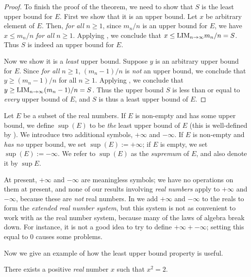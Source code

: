 \begin{proof}
To finish the proof of the theorem, we need to show that \(S\) is the least upper bound for \(E\).
First we show that it is an upper bound.
Let \(x\) be arbitrary element of \(E\).
Then, \emph{for all} \(n \ge 1\), since \(m_n/n\) is an upper bound for \(E\), we have \(x \le m_n/n\) \emph{for all} \(n \ge 1\).
Applying , we conclude that \(x \le \text{LIM}_{n \to \infty} m_n/n = S\).
Thus \(S\) is indeed an upper bound for \(E\).

Now we show it is a \emph{least} upper bound.
Suppose \(y\) is an arbitrary upper bound for \(E\).
Since \emph{for all} \(n \ge 1\), \((m_n - 1)/n\) is \emph{not} an upper bound, we conclude that \(y \ge (m_n - 1)/n\) for all \(n \ge 1\).
Applying , we conclude that \(y \ge \text{LIM}_{n \to \infty}(m_n - 1)/n = S\).
Thus the upper bound \(S\) is less than or equal to \emph{every} upper bound of \(E\), and \(S\) is thus a least upper bound of \(E\).
\end{proof}

\begin{definition}[Supremum] \label{def 5.5.10}
Let \(E\) be a subset of the real numbers.
If \(E\) is non-empty and has some upper bound, we define \(\sup(E)\) to be \emph{the} least upper bound of \(E\)
(this is well-defined by ).
We introduce two additional symbols, \(+\infty\) and \(-\infty\).
If \(E\) is non-empty and \emph{has no} upper bound, we set \(\sup(E) := +\infty\);
if \(E\) is empty, we set \(\sup(E) := -\infty\).
We refer to \(\sup(E)\) as the \emph{supremum} of \(E\), and also denote it by \(\sup E\).
\end{definition}

\begin{remark} \label{remark 5.5.11}
At present, \(+\infty\) and \(-\infty\) are meaningless symbols; 
we have no operations on them at present, and none of our results involving \emph{real numbers} apply to \(+\infty\) and \(-\infty\), because these are \emph{not} real numbers.
In  we add \(+\infty\) and \(-\infty\) to the reals to form the \emph{extended real number system}, but this system is not as convenient to work with as the real number system, because many of the laws of algebra break down.
For instance, it is not a good idea to try to define \(+\infty + -\infty\); setting this equal to 0 causes some problems.
\end{remark}

Now we give an example of how the least upper bound property is useful.

\begin{proposition} \label{prop 5.5.12}
There exists a positive \emph{real} number \(x\) such that \(x^2 = 2\).
\end{proposition}

